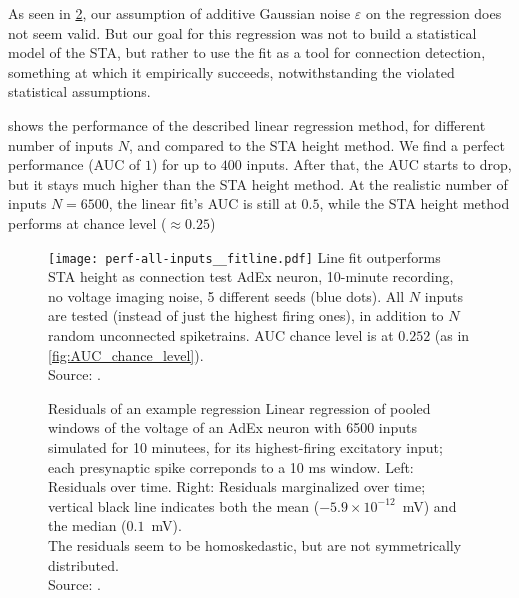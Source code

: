 As seen in \cref{fig:linefit-residuals}, our assumption of additive Gaussian noise $ε$ on the regression does not seem valid. But our goal for this regression was not to build a statistical model of the STA, but rather to use the fit as a tool for connection detection, something at which it empirically succeeds, notwithstanding the violated statistical assumptions.


 shows the performance of the described linear regression method, for different number of inputs $N$, and compared to the STA height method. We find a perfect performance (AUC of $1$) for up to $400$ inputs. After that, the AUC starts to drop, but it stays much higher than the STA height method. At the realistic number of inputs $N = 6500$, the linear fit's AUC is still at $0.5$, while the STA height method performs at chance level ($≈ 0.25$)

\begin{figure}
    \texttt{[image: perf-all-inputs\_\_fitline.pdf]}
    \captionn
        {Line fit outperforms STA height as connection test}
        {AdEx neuron, 10-minute recording, no voltage imaging noise,  5 different seeds (blue dots). All $N$ inputs are tested (instead of just the highest firing ones), in addition to $N$ random unconnected spiketrains. AUC chance level is at $0.252$ (as in \cref{fig:AUC_chance_level}). \\
        Source: .}
    \label{fig:N_sweep__AUC__upstroke_vs_STA}
\end{figure}



\begin{figure}
    \captionn
        {Residuals of an example regression}
        {
        Linear regression of pooled windows of the voltage of an AdEx neuron with 6500 inputs simulated for 10 minutees, for its highest-firing excitatory input; each presynaptic spike correponds to a 10 ms window.
        Left: Residuals over time.
        Right: Residuals marginalized over time; vertical black line indicates both the mean ($-5.9 × 10^{-12}$~mV) and the median ($0.1$~mV).\\
        The residuals seem to be homoskedastic, but are not symmetrically distributed.\\
        Source: .
        }
    \label{fig:linefit-residuals}
\end{figure}


